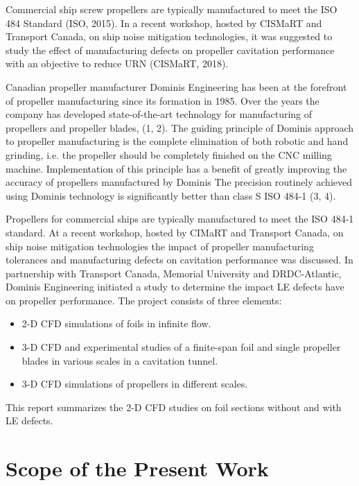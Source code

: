 \documentclass[onecolumn,11pt]{report}
\begin{document}
Commercial ship screw propellers are typically manufactured to meet the ISO 484 Standard (ISO, 2015). In a recent workshop, hosted by CISMaRT and Transport Canada, on ship noise mitigation technologies, it was suggested to study the effect of manufacturing defects on propeller cavitation performance with an objective to reduce URN (CISMaRT, 2018).  

Canadian propeller manufacturer Dominis Engineering has been at the forefront of propeller manufacturing since its formation in 1985. Over the years the company has developed state-of-the-art technology for manufacturing of propellers and propeller blades, (1, 2). The guiding principle of Dominis approach to propeller manufacturing is the complete elimination of both robotic and hand grinding, i.e. the propeller should be completely finished on the CNC milling machine. Implementation of this principle has a benefit of greatly improving the accuracy of propellers manufactured by Dominis The precision routinely achieved using Dominis technology is significantly better than class S ISO 484-1 (3, 4).

Propellers for commercial ships are typically manufactured to meet the ISO 484-1 standard. At a recent workshop, hosted by CIMaRT and Transport Canada, on ship noise mitigation technologies the impact of propeller manufacturing tolerances and manufacturing defects on cavitation performance was discussed. In partnership with Transport Canada, Memorial University and DRDC-Atlantic, Dominis Engineering initiated a study to determine the impact LE defects have on propeller performance. The project consists of three elements:

\begin{itemize}

\item 2-D CFD simulations of foils in infinite flow.\\
\item 3-D CFD and experimental studies of a finite-span foil and single propeller blades in various scales in a cavitation tunnel. \\
\item 3-D CFD simulations of propellers in different scales.

\end{itemize}

This report summarizes the 2-D CFD studies on foil sections without and with LE defects. 


\section{Scope of the Present Work}
\end{document}

